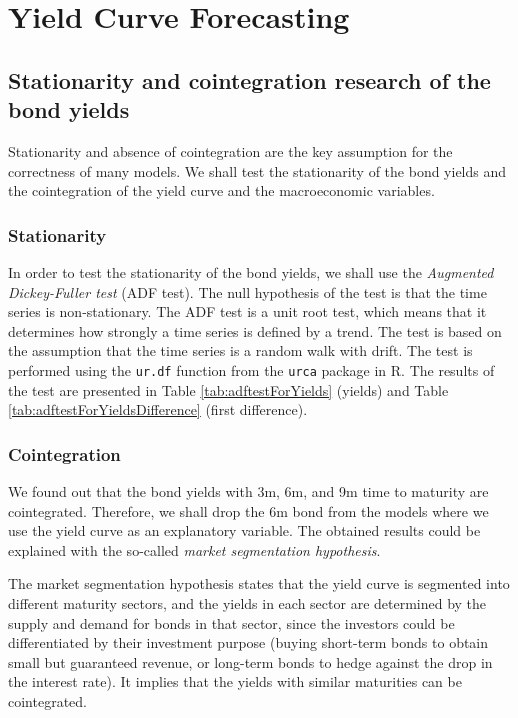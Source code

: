 \section{Yield Curve Forecasting}
    \subsection{Stationarity and cointegration research of the bond yields}
        Stationarity and absence of cointegration are the key assumption for the correctness of many models.
        We shall test the stationarity of the bond yields and the cointegration of the yield curve and the macroeconomic variables.
        \subsubsection{Stationarity}
            In order to test the stationarity of the bond yields, we shall use the \emph{Augmented Dickey-Fuller test} (ADF test).
            The null hypothesis of the test is that the time series is non-stationary.
            The ADF test is a unit root test, which means that it determines how strongly a time series is defined by a trend.
            The test is based on the assumption that the time series is a random walk with drift.
            The test is performed using the \texttt{ur.df} function from the \texttt{urca} package in R.
            The results of the test are presented in Table \ref{tab:adftestForYields} (yields) and Table \ref{tab:adftestForYieldsDifference} (first difference).



        \subsubsection{Cointegration}
            We found out that the bond yields with 3m, 6m, and 9m time to maturity are cointegrated. Therefore, we shall drop the 
            6m bond from the models where we use the yield curve as an explanatory variable. The obtained results could be explained 
            with the so-called \emph{market segmentation hypothesis}. 
            
            The market segmentation hypothesis states that the yield curve is segmented into different maturity sectors, and the 
            yields in each sector are determined by the supply and demand for bonds in that sector, since the investors could be 
            differentiated by their investment purpose (buying short-term bonds to obtain small but guaranteed revenue, or long-term 
            bonds to hedge against the drop in the interest rate). It implies that the yields with similar maturities can be 
            cointegrated.






